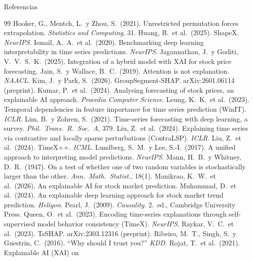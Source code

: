 \documentclass{beamer}
\begin{document}
\begin{frame}[allowframebreaks]{Referencias}
\begin{thebibliography}{99}
         Hooker, G., Mentch, L.\ y Zhou, S.\ (2021). Unrestricted
        permutation forces extrapolation. \emph{Statistics and
        Computing}, 31.
         Huang, B.\ et al.\ (2025). ShapeX. \emph{NeurIPS}.
         Ismail, A.\ A.\ et al.\ (2020). Benchmarking deep
        learning interpretability in time series predictions.
        \emph{NeurIPS}.
         Jagannathan, J.\ y Goditi, V.\ V.\ S.\ K.\ (2025).
        Integration of a hybrid model with XAI for stock price forecasting.
         Jain, S.\ y Wallace, B.\ C.\ (2019). Attention is not
        explanation. \emph{NAACL}.
         Kim, J.\ y Park, S.\ (2026). GroupSegment-SHAP.
        arXiv:2601.06114 (preprint).
         Kumar, P.\ et al.\ (2024). Analysing forecasting of
        stock prices, an explainable AI approach. \emph{Procedia Computer
        Science}.
         Leung, K.\ K.\ et al.\ (2023). Temporal dependencies in
        feature importance for time series prediction (WinIT).
        \emph{ICLR}.
         Lim, B.\ y Zohren, S.\ (2021). Time-series forecasting
        with deep learning, a survey. \emph{Phil.\ Trans.\ R.\ Soc.\ A},
        379.
         Liu, Z.\ et al.\ (2024). Explaining time series via
        contrastive and locally sparse perturbations (ContraLSP).
        \emph{ICLR}.
         Liu, Z.\ et al.\ (2024). TimeX++. \emph{ICML}.
         Lundberg, S.\ M.\ y Lee, S.-I.\ (2017). A unified
        approach to interpreting model predictions. \emph{NeurIPS}.
         Mann, H.\ B.\ y Whitney, D.\ R.\ (1947). On a test of
        whether one of two random variables is stochastically larger than
        the other. \emph{Ann.\ Math.\ Statist.}, 18(1).
         Manikrao, K.\ W.\ et al.\ (2026). An explainable AI for
        stock market prediction.
         Muhammad, D.\ et al.\ (2024). An explainable deep
        learning approach for stock market trend prediction.
        \emph{Heliyon}.
         Pearl, J.\ (2009). \emph{Causality}. 2.\ ed.,
        Cambridge University Press.
         Queen, O.\ et al.\ (2023). Encoding time-series
        explanations through self-supervised model behavior consistency
        (TimeX). \emph{NeurIPS}.
         Raykar, V.\ C.\ et al.\ (2023). TsSHAP. arXiv:2303.12316
        (preprint).
         Ribeiro, M.\ T., Singh, S.\ y Guestrin, C.\ (2016).
        ``Why should I trust you?'' \emph{KDD}.
         Rojat, T.\ et al.\ (2021). Explainable AI (XAI) on

\end{thebibliography}
\end{frame}
\end{document}
